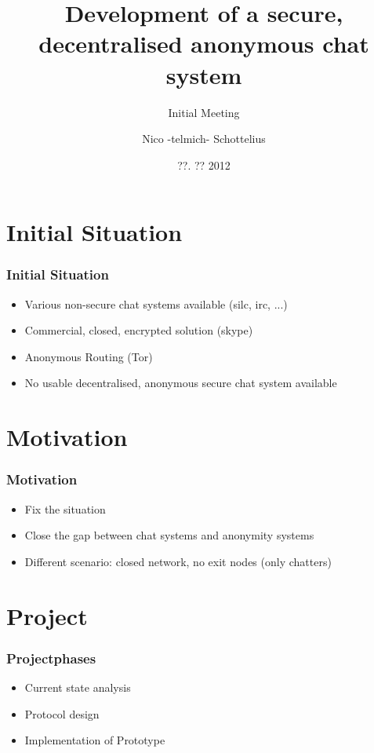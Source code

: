 \documentclass{beamer}
\title{Development of a secure, decentralised anonymous chat system}
\subtitle{Initial Meeting}
\author{Nico -telmich- Schottelius}
\date{??. ?? 2012}
\begin{document}
\frame{\titlepage}

\frame{\tableofcontents}

\section{Initial Situation}

\frame
{
  \frametitle{Initial Situation}
  \begin{itemize}
  \item Various non-secure chat systems available (silc, irc, ...)
  \item Commercial, closed, encrypted solution (skype)
  \item Anonymous Routing (Tor)
  \item No usable decentralised, anonymous secure chat system available
  \end{itemize}
}

\section{Motivation}
\frame
{
  \frametitle{Motivation}
  \begin{itemize}
     \item Fix the situation
     \item Close the gap between chat systems and anonymity systems
     \item Different scenario: closed network, no exit nodes (only chatters)
  \end{itemize}
}

\section{Project}
\frame
{
  \frametitle{Projectphases}
  \begin{itemize}
     \item Current state analysis
     \item Protocol design
     \item Implementation of Prototype
  \end{itemize}
}
\end{document}
